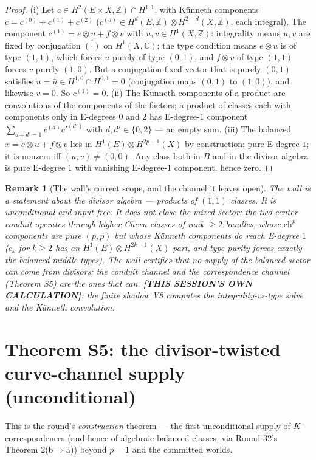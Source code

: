 \documentclass[11pt]{article}
\newtheorem{remark}[theorem]{Remark}
\newcommand{\MINE}{\textbf{[THIS SESSION'S OWN CALCULATION]}}
\newcommand{\Z}{\mathbb{Z}}
\newcommand{\C}{\mathbb{C}}
\begin{document}
\begin{proof}
(i) Let $c\in H^{2}(E\times X,\Z)\cap H^{1,1}$, with Künneth components
$c=c^{(0)}+c^{(1)}+c^{(2)}$ ($c^{(d)}\in H^{d}(E,\Z)\otimes H^{2-d}(X,\Z)$,
each integral). The component $c^{(1)}=e\otimes u+f\otimes v$ with
$u,v\in H^{1}(X,\Z)$: integrality means $u,v$ are fixed by conjugation
$\overline{(\cdot)}$ on $H^{1}(X,\C)$; the type condition means $e\otimes u$
is of type $(1,1)$, which forces $u$ purely of type $(0,1)$, and $f\otimes v$
of type $(1,1)$ forces $v$ purely $(1,0)$. But a conjugation-fixed vector
that is purely $(0,1)$ satisfies $u=\bar u\in H^{1,0}\cap H^{0,1}=0$
(conjugation maps $(0,1)$ to $(1,0)$), and likewise $v=0$. So $c^{(1)}=0$.
(ii) The Künneth components of a product are convolutions of the components
of the factors; a product of classes each with components only in E-degrees
$0$ and $2$ has E-degree-$1$ component
$\sum_{d+d'=1}c^{(d)}c'^{(d')}$ with $d,d'\in\{0,2\}$ --- an empty sum.
(iii) The balanced $x=e\otimes u+f\otimes v$ lies in
$H^{1}(E)\otimes H^{2p-1}(X)$ by construction: pure E-degree $1$; it is
nonzero iff $(u,v)\ne(0,0)$. Any class both in $B$ and in the divisor
algebra is pure E-degree $1$ with vanishing E-degree-$1$ component, hence
zero.
\end{proof}

\begin{remark}[The wall's correct scope, and the channel it leaves open]
The wall is a statement about the \emph{divisor algebra} --- products of
$(1,1)$ classes. It is unconditional and input-free. It does \emph{not}
close the mixed sector: the two-center conduit operates through
\emph{higher Chern classes of rank $\ge2$ bundles}, whose
$\mathrm{ch}^{p}$ components are pure $(p,p)$ but whose Künneth components
\emph{do} reach E-degree $1$ ($c_k$ for $k\ge2$ has an
$H^{1}(E)\otimes H^{2k-1}(X)$ part, and type-purity forces exactly the
balanced middle types). The wall certifies that no supply of the balanced
sector can come from divisors; the conduit channel and the correspondence
channel (Theorem S5) are the ones that can. \MINE{}: the finite shadow V8
computes the integrality-vs-type solve and the Künneth convolution.
\end{remark}

\section{Theorem S5: the divisor-twisted curve-channel supply (unconditional)}

This is the round's \emph{construction} theorem --- the first unconditional
supply of $K$-correspondences (and hence of algebraic balanced classes, via
Round 32's Theorem 2(b$\Rightarrow$a)) beyond $p=1$ and the committed
worlds.
\end{document}
